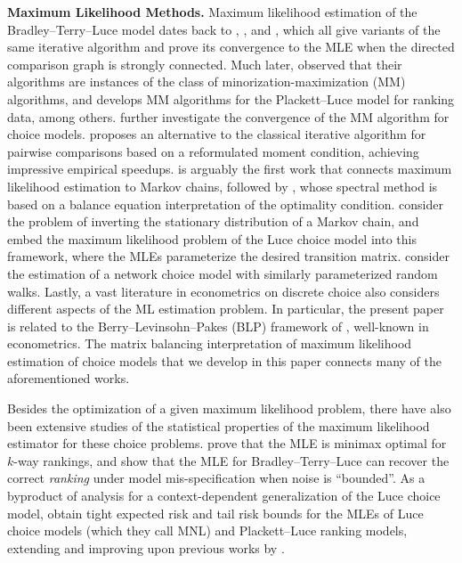 \textbf{Maximum Likelihood Methods.}
Maximum likelihood estimation of the Bradley--Terry--Luce model 
dates back to \citet{zermelo1929berechnung}, \citet{dykstra1956note}, and \citet{ford1957solution}, which all give variants of the same iterative algorithm and prove its convergence to the MLE when the directed comparison graph is strongly connected. 
Much later, \citet{hunter2004mm} observed that their
algorithms are instances of the class of minorization-maximization (MM) algorithms, and develops MM algorithms for the Plackett--Luce model for ranking data, among others. \citet{vojnovic2020convergence} further investigate the convergence of the MM algorithm for choice models. \citet{newman2023efficient} proposes an alternative to the classical iterative algorithm for pairwise comparisons based on a reformulated moment condition, achieving impressive empirical speedups. \citet{negahban2012iterative} is arguably the first work that connects maximum likelihood estimation to Markov chains, followed by \citet{maystre2015fast}, whose spectral method is based on a balance equation interpretation of the optimality condition.
\citet{kumar2015inverting} consider the problem of inverting the stationary distribution of a Markov
chain, and embed the maximum likelihood problem of the Luce choice model into this
framework, where the MLEs parameterize the desired transition matrix. \citet{maystre2017choicerank} consider the estimation of a network choice model with similarly parameterized random walks. Lastly, a vast literature in econometrics on discrete choice also considers different aspects of the ML estimation problem. In particular, the present paper is related to the Berry--Levinsohn--Pakes (BLP) framework of \citet{berry1995automobile}, well-known in econometrics. The matrix balancing interpretation of maximum likelihood estimation of choice models that we develop in this paper connects many of the aforementioned works.

Besides the optimization of a given maximum likelihood problem, there have also been extensive studies of the
statistical properties of the maximum likelihood estimator for these choice problems. \citet{hajek2014minimax}
prove that the MLE is minimax optimal for $k$-way rankings, and
\citet{rajkumar2014statistical} show that the MLE for Bradley--Terry--Luce can recover the correct \emph{ranking} under model mis-specification
when noise is ``bounded''. As a byproduct of analysis for a context-dependent generalization of the Luce choice model, \citet{seshadri2020learning} obtain tight expected risk and tail risk bounds for the MLEs of Luce choice models (which they call MNL) and Plackett--Luce ranking models, extending and improving upon previous works by \citet{hajek2014minimax,shah2015estimation,vojnovic2016parameter}. 

